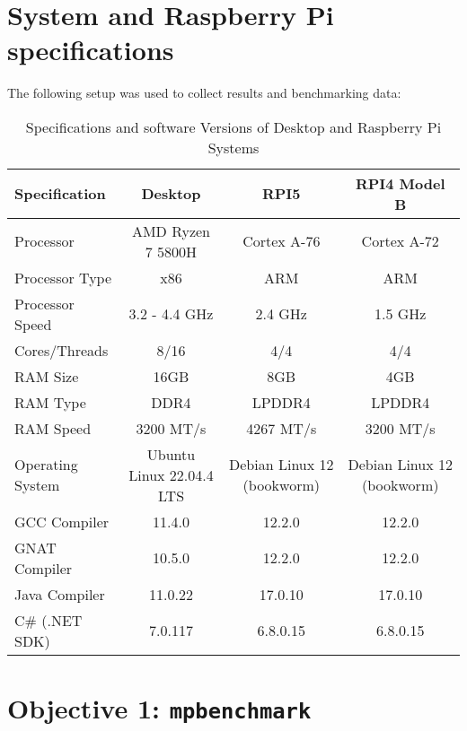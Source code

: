 \section{System and Raspberry Pi specifications}
\label{sec:sysetm_specs}

The following setup was used to collect results and benchmarking data:

\begin{table}[htbp]
	\centering
	\begin{tabular}{@{}lccc@{}}
		\toprule
		\textbf{Specification} & \textbf{Desktop} & \textbf{RPI5} & \textbf{RPI4 Model B} \\ 
		\midrule
		Processor             & AMD Ryzen 7 5800H & Cortex A-76 & Cortex A-72 \\
		Processor Type          & x86                      & ARM            & ARM \\
		Processor Speed        & 3.2 - 4.4 GHz       & 2.4 GHz       & 1.5 GHz\\
		Cores/Threads            & 8/16                    & 4/4                & 4/4 \\
		RAM Size                   & 16GB                  & 8GB              & 4GB \\
		RAM Type                  & DDR4                  & LPDDR4       & LPDDR4 \\
		RAM Speed                & 3200 MT/s           & 4267 MT/s    &3200 MT/s \\
		Operating System      & Ubuntu Linux 22.04.4 LTS & Debian Linux 12 (bookworm) &  Debian Linux 12 (bookworm)\\
		GCC Compiler           & 11.4.0               & 12.2.0        &  12.2.0\\
		GNAT Compiler         & 10.5.0               & 12.2.0        &  12.2.0\\
		Java Compiler            & 11.0.22            & 17.0.10      &  17.0.10\\
		C\# (.NET SDK)         & 7.0.117             & 6.8.0.15     &  6.8.0.15\\
		\bottomrule
	\end{tabular}
	\caption{Specifications and software Versions of Desktop and Raspberry Pi Systems}
	\label{tab:spec_comparisons}
\end{table}

\section{Objective 1: \texttt{mpbenchmark}}

